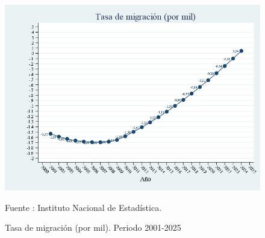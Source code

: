 \begin{figure}[H]
\begin{center}
                    \caption{Tasa de migración (por mil). Periodo 2001-2025}
                    \includegraphics[scale=0.45]{INE_indic_tasamig.png}
                                    \item \footnotesize Fuente : Instituto Nacional de Estadística.
                    \end{center}
\end{figure}
